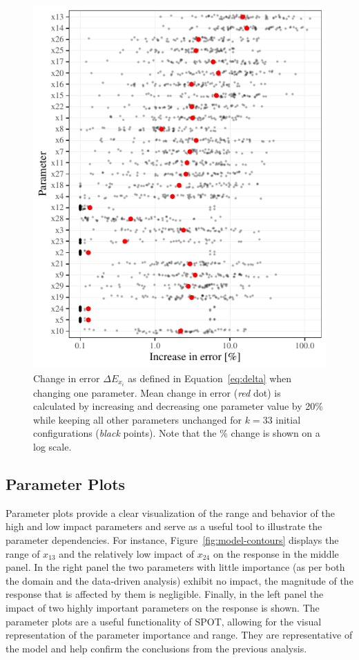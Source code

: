 \documentclass[conference]{IEEEtran}
\begin{document}
\begin{figure}
    \centering
    \includegraphics{variable_error_change.pdf}
    \caption{%
    Change in error $\Delta E_{x_i}$ as defined in Equation~\ref{eq:delta} when changing one parameter. 
    Mean change in error (\emph{red}\/ dot) is calculated by increasing and decreasing one parameter value 
    by 20\% while keeping all other parameters unchanged for $k=33$ initial configurations (\emph{black}\/ points).
    Note that the \% change is shown on a log scale.}
\label{fig:errorChangebarplot}
\end{figure}

\subsection{Parameter Plots}

Parameter plots provide a clear visualization of the range and behavior of the high and low impact parameters and serve as a useful tool to illustrate the parameter dependencies. 
For instance, Figure~\ref{fig:model-contours} displays the range of \emph{$x_{13}$} and the relatively low impact of \emph{$x_{24}$} on the response in the middle panel. 
In the right panel the two parameters with little importance (as per both the domain and the data-driven analysis) exhibit no impact, the magnitude of the response that is affected by them is negligible.
Finally, in the left panel the impact of two highly important parameters on the response is shown.
The parameter plots are a useful functionality of \gls{SPOT}, allowing for the visual representation of the parameter importance and range. They are representative of the model and help confirm the conclusions from the previous analysis.
\end{document}
